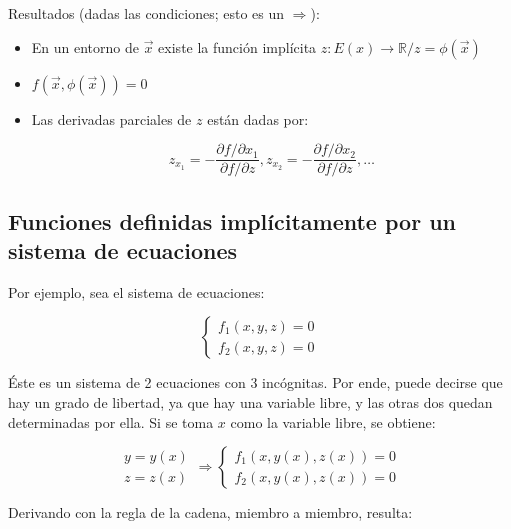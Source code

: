 \documentclass{article}
\renewcommand{\Bbb}{\mathbb}
\begin{document}
Resultados (dadas las condiciones; esto es un $\Rightarrow$):

\begin{itemize}
\item En un entorno de $\overrightarrow{x}$ existe la función implícita $z:E(x) \rightarrow \Bbb R / z = \phi(\overrightarrow{x})$
\item $f(\overrightarrow{x}, \phi(\overrightarrow{x})) = 0$
\item Las derivadas parciales de $z$ están dadas por:

\begin{equation}
z_{x_1} = -\frac{\partial f / \partial x_1}{\partial f / \partial z}, z_{x_2} = -\frac{\partial f / \partial x_2}{\partial f / \partial z}, \ldots
\end{equation}
\end{itemize}

\subsection{Funciones definidas implícitamente por un sistema de ecuaciones}

Por ejemplo, sea el sistema de ecuaciones:

\begin{equation}
\left\{
\begin{array}{ll}
f_1(x, y, z) = 0 \\
f_2(x, y, z) = 0
\end{array}
\right.
\end{equation}

Éste es un sistema de 2 ecuaciones con 3 incógnitas. Por ende, puede decirse que hay un grado de libertad, ya que hay una variable libre, y las otras dos quedan determinadas por ella. Si se toma $x$ como la variable libre, se obtiene:

\begin{equation}
\begin{array}{ll}
y = y(x) \\
z = z(x)
\end{array} \Rightarrow
\left\{
\begin{array}{ll}
f_1(x, y(x), z(x)) = 0 \\
f_2(x, y(x), z(x)) = 0
\end{array}
\right.
\end{equation}

Derivando con la regla de la cadena, miembro a miembro, resulta:
\end{document}
